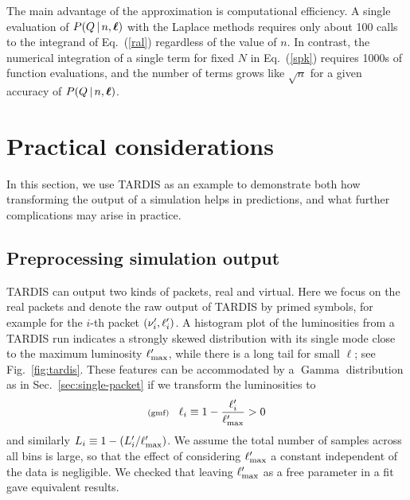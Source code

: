 \documentclass[11pt]{article}
\newcommand{\lleq}[1]{\label{#1} }
\renewcommand{\lleq}[1]{\label{#1} {\scriptstyle {\rm (#1)}} \hspace*{2ex} }
\newcommand{\cond}{\,|\,}
\newcommand{\refeq}[1]{Eq.~(\ref{#1})}
\newcommand{\reffig}[1]{Fig.~\ref{fig:#1}}
\newcommand{\refsec}[1]{Sec.~\ref{sec:#1}}
\DeclareMathOperator{\GammaDist}{Gamma}
\newcommand{\lmax}{\ell_{\rm max}}
\newcommand{\tardis}{TARDIS}
\begin{document}
The main advantage of the approximation is computational efficiency. A
single evaluation of $P(Q \cond n, \bml)$ with the Laplace methods
requires only about 100 calls to the integrand of \refeq{ral}
regardless of the value of $n$. In contrast, the numerical integration
of a single term for fixed $N$ in \refeq{spk} requires 1000s of
function evaluations, and the number of terms grows like $\sqrt{n}$
for a given accuracy of $P(Q \cond n, \bml)$.

\section{Practical considerations} \label{sec:prac-consid}

In this section, we use \tardis{} as an example to demonstrate both how
transforming the output of a simulation helps in predictions, and what
further complications may arise in practice.

\subsection{Preprocessing simulation output } \label{sec:tardis}

\tardis{} can output two kinds of packets, real and virtual. Here we
focus on the real packets and denote the raw output of \tardis{} by
primed symbols, for example for the $i$-{th} packet
$\qty(\nu_i^\prime, \ell_i^\prime)$.  A histogram plot of the
luminosities from a \tardis{} run indicates a strongly skewed
distribution with its single mode close to the maximum luminosity
$\lmax^\prime$, while there is a long tail for small $\ell$; see
\reffig{tardis}. These features can be accommodated by a $\GammaDist$
distribution as in \refsec{single-packet} if we transform the
luminosities to
\begin{align}
  \lleq{gmf}
  \ell_i \equiv 1- \frac{\ell_i^\prime}{\lmax^\prime} > 0
\end{align}
and similarly $L_i \equiv 1 - (L_i^\prime/\lmax^\prime)$. We assume
the total number of samples across all bins is large, so that the effect
of considering $\lmax^\prime$ a constant independent of the data is
negligible. We checked that leaving $\lmax^\prime$ as a free parameter
in a fit gave equivalent results.
\end{document}
